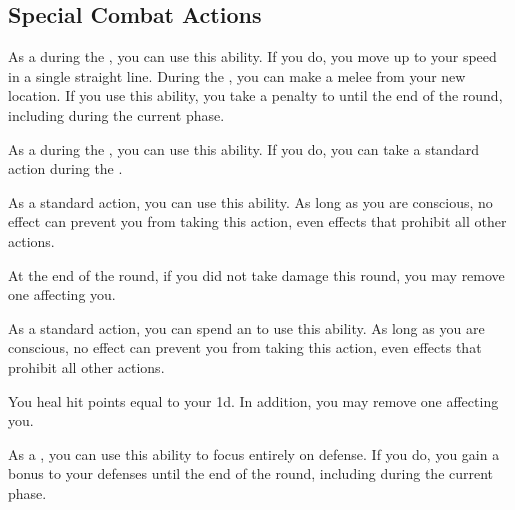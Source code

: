     \subsection{Special Combat Actions}

        \label{Charge} As a  during the , you can use this ability.
        If you do, you move up to your speed in a single straight line.
        During the , you can make a melee  from your new location.
        If you use this ability, you take a  penalty to  until the end of the round, including during the current phase.

        \label{Delay}
        As a  during the , you can use this ability.
        If you do, you can take a standard action during the .

        \label{Desperate Recovery}
        As a standard action, you can use this ability.
        As long as you are conscious, no effect can prevent you from taking this action, even effects that prohibit all other actions.
        \begin{ability}
            \begin{spelleffects}
                \spelleffect At the end of the round, if you did not take damage this round, you may remove one  affecting you.
            \end{spelleffects}
        \end{ability}

        \label{Recover}
        As a standard action, you can spend an  to use this ability.
        As long as you are conscious, no effect can prevent you from taking this action, even effects that prohibit all other actions.
        \begin{ability}
            \begin{spelleffects}
                \spelleffect You heal hit points equal to your  \minus1d.
                In addition, you may remove one  affecting you.
            \end{spelleffects}
        \end{ability}

        \label{Total Defense}
        As a , you can use this ability to focus entirely on defense.
        If you do, you gain a  bonus to your defenses until the end of the round, including during the current phase.

